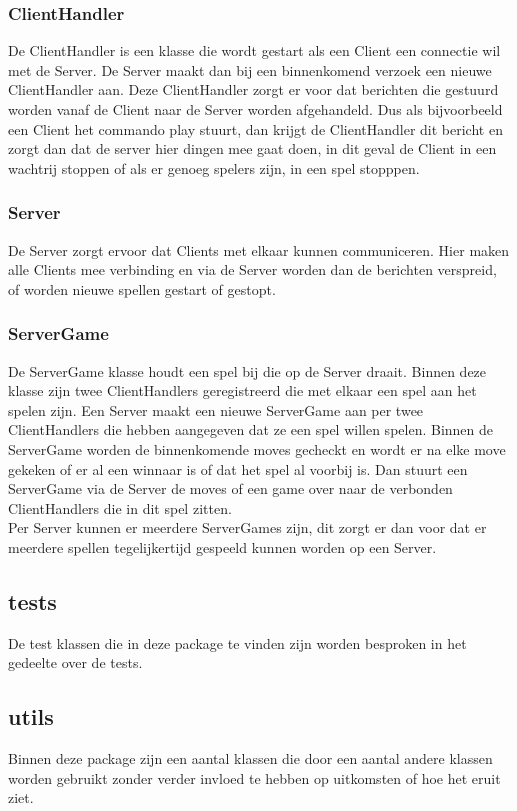 \documentclass[12pt]{article}
\begin{document}
\subsubsection{ClientHandler}
De ClientHandler is een klasse die wordt gestart als een Client een connectie wil met de Server. De Server maakt dan bij een binnenkomend verzoek een nieuwe ClientHandler aan. Deze ClientHandler zorgt er voor dat berichten die gestuurd worden vanaf de Client naar de Server worden afgehandeld. Dus als bijvoorbeeld een Client het commando play stuurt, dan krijgt de ClientHandler dit bericht en zorgt dan dat de server hier dingen mee gaat doen, in dit geval de Client in een wachtrij stoppen of als er genoeg spelers zijn, in een spel stopppen.
\subsubsection{Server}
De Server zorgt ervoor dat Clients met elkaar kunnen communiceren. Hier maken alle Clients mee verbinding en via de Server worden dan de berichten verspreid, of worden nieuwe spellen gestart of gestopt. 
\subsubsection{ServerGame}
De ServerGame klasse houdt een spel bij die op de Server draait. Binnen deze klasse zijn twee ClientHandlers geregistreerd die met elkaar een spel aan het spelen zijn. Een Server maakt een nieuwe ServerGame aan per twee ClientHandlers die hebben aangegeven dat ze een spel willen spelen. Binnen de ServerGame worden de binnenkomende moves gecheckt en wordt er na elke move gekeken of er al een winnaar is of dat het spel al voorbij is. Dan stuurt een ServerGame via de Server de moves of een game over naar de verbonden ClientHandlers die in dit spel zitten.\\
Per Server kunnen er meerdere ServerGames zijn, dit zorgt er dan voor dat er meerdere spellen tegelijkertijd gespeeld kunnen worden op een Server.

\subsection{tests}
De test klassen die in deze package te vinden zijn worden besproken in het gedeelte over de tests.

\subsection{utils}
Binnen deze package zijn een aantal klassen die door een aantal andere klassen worden gebruikt zonder verder invloed te hebben op uitkomsten of hoe het eruit ziet.
\end{document}
